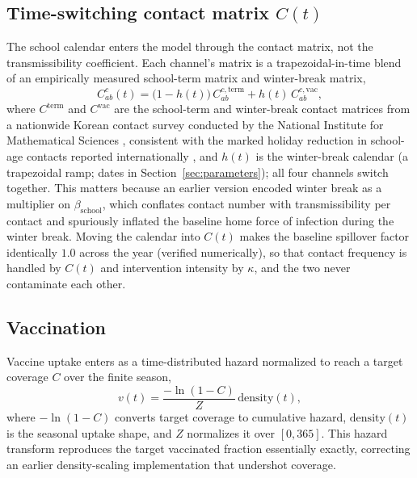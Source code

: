 \documentclass[12pt]{article}
\theoremstyle{plain}
\theoremstyle{remark}
\theoremstyle{definition}
\begin{document}
\subsection{Time-switching contact matrix \texorpdfstring{$C(t)$}{C(t)}}
\label{sec:ctime}
The school calendar enters the model through the contact matrix, not the transmissibility coefficient. Each channel's matrix is a trapezoidal-in-time blend of an empirically measured school-term matrix and winter-break matrix,
\begin{equation}
C^{c}_{ab}(t) = \bigl(1 - h(t)\bigr)\, C^{c,\mathrm{term}}_{ab} + h(t)\, C^{c,\mathrm{vac}}_{ab},
\end{equation}
where $C^{\mathrm{term}}$ and $C^{\mathrm{vac}}$ are the school-term and winter-break contact matrices from a nationwide Korean contact survey conducted by the National Institute for Mathematical Sciences \cite{Son2025,Chae2026}, consistent with the marked holiday reduction in school-age contacts reported internationally \cite{Eames2012}, and $h(t)$ is the winter-break calendar (a trapezoidal ramp; dates in Section~\ref{sec:parameters}); all four channels switch together. This matters because an earlier version encoded winter break as a multiplier on $\beta_{\mathrm{school}}$, which conflates contact number with transmissibility per contact and spuriously inflated the baseline home force of infection during the winter break. Moving the calendar into $C(t)$ makes the baseline spillover factor identically $1.0$ across the year (verified numerically), so that contact frequency is handled by $C(t)$ and intervention intensity by $\kappa$, and the two never contaminate each other.

\subsection{Vaccination}
\label{sec:vax}
Vaccine uptake enters as a time-distributed hazard normalized to reach a target coverage $C$ over the finite season,
\begin{equation}
v(t) = \frac{-\ln(1 - C)}{Z}\, \mathrm{density}(t),
\end{equation}
where $-\ln(1 - C)$ converts target coverage to cumulative hazard, $\mathrm{density}(t)$ is the seasonal uptake shape, and $Z$ normalizes it over $[0,365]$. This hazard transform reproduces the target vaccinated fraction essentially exactly, correcting an earlier density-scaling implementation that undershot coverage.
\end{document}
